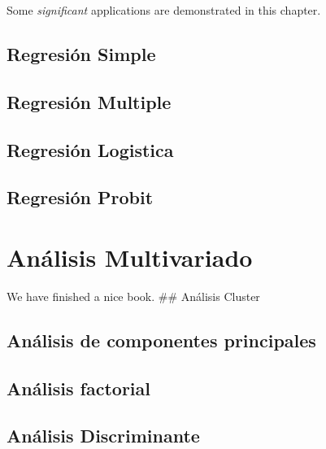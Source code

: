 \documentclass[
]{book}
\begin{document}
Some \emph{significant} applications are demonstrated in this chapter.

\hypertarget{regresiuxf3n-simple}{%
\section{Regresión Simple}\label{regresiuxf3n-simple}}

\hypertarget{regresiuxf3n-multiple}{%
\section{Regresión Multiple}\label{regresiuxf3n-multiple}}

\hypertarget{regresiuxf3n-logistica}{%
\section{Regresión Logistica}\label{regresiuxf3n-logistica}}

\hypertarget{regresiuxf3n-probit}{%
\section{Regresión Probit}\label{regresiuxf3n-probit}}

\hypertarget{anuxe1lisis-multivariado}{%
\chapter{Análisis Multivariado}\label{anuxe1lisis-multivariado}}

We have finished a nice book.
\#\# Análisis Cluster

\hypertarget{anuxe1lisis-de-componentes-principales}{%
\section{Análisis de componentes principales}\label{anuxe1lisis-de-componentes-principales}}

\hypertarget{anuxe1lisis-factorial}{%
\section{Análisis factorial}\label{anuxe1lisis-factorial}}

\hypertarget{anuxe1lisis-discriminante}{%
\section{Análisis Discriminante}\label{anuxe1lisis-discriminante}}
\end{document}
